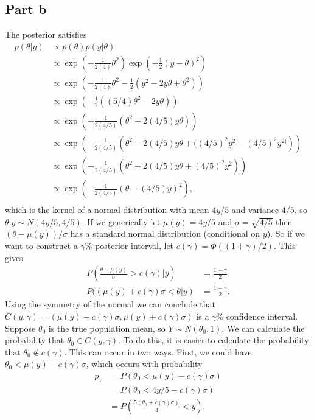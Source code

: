 \documentclass[a4paper,10pt]{article}
\begin{document}
\subsection{Part b}
The posterior satisfies
\begin{align*}
p(\theta|y) &\propto p(\theta)p(y|\theta) \\
&\propto \exp\left(-\frac{1}{2(4)}\theta^{2}\right)\exp\left(-\frac{1}{2}(y - \theta)^{2}\right) \\
&\propto \exp\left(-\frac{1}{2(4)}\theta^{2}-\frac{1}{2}\left(y^{2}-2y\theta + \theta^{2}\right)\right) \\
&\propto \exp\left(-\frac{1}{2}\left((5/4)\theta^{2}-2y\theta\right)\right) \\
&\propto \exp\left(-\frac{1}{2(4/5)}\left(\theta^{2}-2(4/5)y\theta\right)\right) \\
&\propto \exp\left(-\frac{1}{2(4/5)}\left(\theta^{2}-2(4/5)y\theta + ((4/5)^{2}y^{2} - (4/5)^{2}y^{2)}\right)\right) \\
&\propto \exp\left(-\frac{1}{2(4/5)}\left(\theta^{2}-2(4/5)y\theta + (4/5)^{2}y^{2}\right)\right) \\
&\propto \exp\left(-\frac{1}{2(4/5)}\left(\theta - (4/5)y\right)^{2}\right), \\
\end{align*}
which is the kernel of a normal distribution with mean $4y/5$ and variance $4/5$, so $\theta|y \sim N(4y/5, 4/5)$.  If we generically let $\mu(y) = 4y/5$ and $\sigma = \sqrt{4/5}$ then $(\theta-\mu(y))/\sigma$ has a standard normal distribution (conditional on $y$).  So if we want to construct a $\gamma$\% posterior interval, let $c(\gamma) = \Phi((1+\gamma)/2)$.  This gives
\begin{align*}
P\left(\frac{\theta-\mu(y)}{\sigma} > c(\gamma)|y\right) &= \frac{1-\gamma}{2} \\
P(\left(\mu(y) + c(\gamma)\sigma < \theta|y\right) &= \frac{1-\gamma}{2}.
\end{align*}
Using the symmetry of the normal we can conclude that $C(y, \gamma) = (\mu(y)-c(\gamma)\sigma,\mu(y)+c(\gamma)\sigma)$ is a $\gamma$\% confidence interval.  Suppose $\theta_{0}$ is the true population mean, so $Y \sim N(\theta_{0},1)$.  We can calculate the probability that $\theta_{0} \in C(y, \gamma)$.  To do this, it is easier to calculate the probability that $\theta_{0} \notin c(\gamma)$.  This can occur in two ways.  First, we could have $\theta_{0} < \mu(y)-c(\gamma)\sigma$, which occurs with probability 
\begin{align*}
p_{1} &= P(\theta_{0}<\mu(y)-c(\gamma)\sigma) \\
&= P(\theta_{0}<4y/5-c(\gamma)\sigma) \\
&= P\left(\frac{5(\theta_{0}+c(\gamma)\sigma)}{4} < y\right).
\end{align*}
\end{document}
